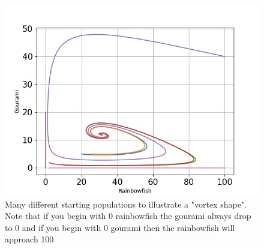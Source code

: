 \begin{figure}[H]
    \centering
    \includegraphics[scale=0.4]{../figures/Figure_4.png}
    \caption{Many different starting populations to illustrate a "vortex shape".
        Note that if you begin
        with 0 rainbowfish the gourami always drop to 0 and if you begin with 0
        gourami then the rainbowfish will approach 100}
\end{figure}
